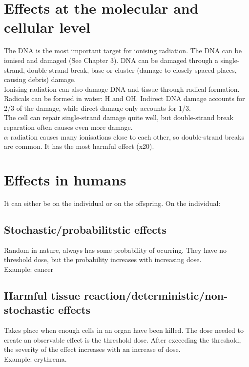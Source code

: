 \section{Effects at the molecular and cellular level}
The DNA is the most important target for ionising radiation. The DNA can be ionised and damaged (See Chapter 3). DNA can be damaged through a single-strand, double-strand break, base or cluster (damage to closely spaced places, causing debris) damage.\\
Ionising radiation can also damage DNA and tissue through radical formation. Radicals can be formed in water: H and OH. Indirect DNA damage accounts for 2/3 of the damage, while direct damage only accounts for 1/3.\\ 
The cell can repair single-strand damage quite well, but double-strand break reparation often causes even more damage. \\
$\alpha$ radiation causes many ionisations close to each other, so double-strand breaks are common. It has the most harmful effect (x20).
\section{Effects in humans}
It can either be on the individual or on the offspring. On the individual:
\subsection{Stochastic/probabilitstic effects}
Random in nature, always has some probability of ocurring. They have no threshold dose, but the probability increases with increasing dose.\\
Example: cancer

\subsection{Harmful tissue reaction/deterministic/non-stochastic effects}
Takes place when enough cells in an organ have been killed. The dose needed to create an observable effect is the threshold dose. After exceeding the threshold, the severity of the effect increases with an increase of dose.\\ Example: erythrema.

